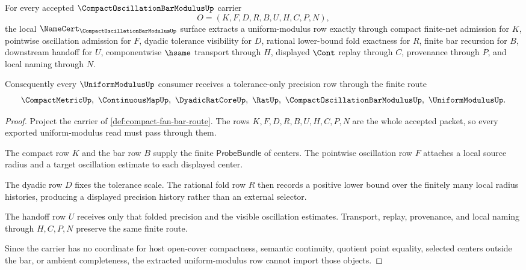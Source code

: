 \begin{theorem}
\label{thm:compact-fan-bar-modulus-extraction}
For every accepted $\CompactOscillationBarModulusUp$ carrier
$$
O=(K,F,D,R,B,U,H,C,P,N),
$$
the local $\NameCert_{\CompactOscillationBarModulusUp}$ surface extracts a uniform-modulus row exactly through compact finite-net admission for $K$, pointwise oscillation admission for $F$, dyadic tolerance visibility for $D$, rational lower-bound fold exactness for $R$, finite bar recursion for $B$, downstream handoff for $U$, componentwise $\hsame$ transport through $H$, displayed $\Cont$ replay through $C$, provenance through $P$, and local naming through $N$.

Consequently every $\UniformModulusUp$ consumer receives a tolerance-only precision row through the finite route
$$
\CompactMetricUp,\ \ContinuousMapUp,\ \DyadicRatCoreUp,\ \RatUp,\ \CompactOscillationBarModulusUp,\ \UniformModulusUp .
$$
\end{theorem}
\begin{proof}
Project the carrier of \autoref{def:compact-fan-bar-route}. The rows $K,F,D,R,B,U,H,C,P,N$ are the whole accepted packet, so every exported uniform-modulus read must pass through them.

The compact row $K$ and the bar row $B$ supply the finite $\mathsf{ProbeBundle}$ of centers. The pointwise oscillation row $F$ attaches a local source radius and a target oscillation estimate to each displayed center.

The dyadic row $D$ fixes the tolerance scale. The rational fold row $R$ then records a positive lower bound over the finitely many local radius histories, producing a displayed precision history rather than an external selector.

The handoff row $U$ receives only that folded precision and the visible oscillation estimates. Transport, replay, provenance, and local naming through $H,C,P,N$ preserve the same finite route.

Since the carrier has no coordinate for host open-cover compactness, semantic continuity, quotient point equality, selected centers outside the bar, or ambient completeness, the extracted uniform-modulus row cannot import those objects.
\end{proof}


